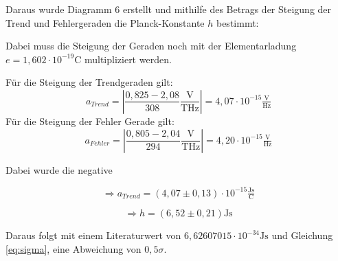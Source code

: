 Daraus wurde Diagramm 6 erstellt und mithilfe des Betrags der Steigung der Trend und Fehlergeraden die Planck-Konstante $h$ bestimmt:

Dabei muss die Steigung der Geraden noch mit der Elementarladung $e = 1,602 \cdot 10^{-19} \text{C}$
multipliziert werden.

Für die Steigung der Trendgeraden gilt:
\begin{equation}
    a_{Trend} = \left|\frac{0,825-2,08}{308} \frac{\text{V}}{\text{THz}}\right| = 4,07 \cdot 10^{-15} \tfrac{\text{V}}{\text{Hz}}
\end{equation}
Für die Steigung der Fehler Gerade gilt:
\begin{equation}
    a_{Fehler} = \left|\frac{0,805-2,04}{294}  \frac{\text{V}}{\text{THz}}\right| = 4,20 \cdot 10^{-15} \tfrac{\text{V}}{\text{Hz}}
\end{equation}

Dabei wurde die negative 

\[ \Rightarrow a_{Trend} = (4,07\pm0,13) \cdot 10^{-15}\tfrac{\text{Js}}{\text{C}}\]

\[ \Rightarrow h = (6,52 \pm 0,21 ) \text{Js}\]

Daraus folgt mit einem Literaturwert von $6,626 070 15 \cdot 10^{-34} \text{Js}$ und Gleichung \ref{eq:sigma}, eine
Abweichung von $0,5 \sigma$.

